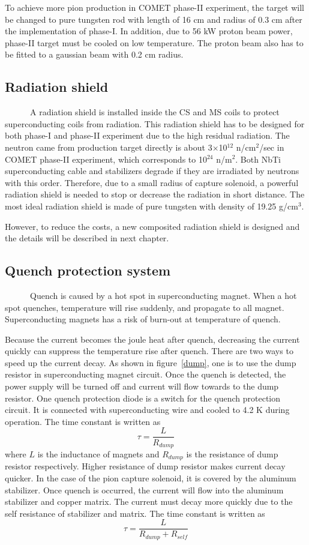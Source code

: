 To achieve more pion production in COMET phase-II experiment, the target will be changed to pure tungsten rod with length of 16 cm and radius of 0.3 cm after the implementation of phase-I.
In addition, due to 56 kW proton beam power, phase-II target must be cooled on low temperature.
The proton beam also has to be fitted to a gaussian beam with 0.2 cm radius.

\subsection{Radiation shield}
~~~~~~A radiation shield is installed inside the CS and MS coils to protect superconducting coils from radiation.
This radiation shield has to be designed for both phase-I and phase-II experiment due to the high residual radiation.
The neutron came from production target directly is about 3$\times$10$^{12}$ n/cm$^2$/sec in COMET phase-II experiment, which corresponds to 10$^{24}$ n/m$^2$.
Both NbTi superconducting cable and stabilizers degrade if they are irradiated by neutrons with this order.
Therefore, due to a small radius of capture solenoid, a powerful radiation shield is needed to stop or decrease the radiation in short distance.
The most ideal radiation shield is made of pure tungsten with density of 19.25 g/cm$^3$.

However, to reduce the costs, a new composited radiation shield is designed and the details will be described in next chapter.

\subsection{Quench protection system}
~~~~~~Quench is caused by a hot spot in superconducting magnet.
When a hot spot quenches, temperature will rise suddenly, and propagate to all magnet.
Superconducting magnets has a risk of burn-out at temperature of quench.

Because the current becomes the joule heat after quench, decreasing the current quickly can suppress the temperature rise after quench.
There are two ways to speed up the current decay.
As shown in figure~\ref{dump}, one is to use the dump resistor in superconducting magnet circuit.
Once the quench is detected, the power supply will be turned off and current will flow towards to the dump resistor.
One quench protection diode is a switch for the quench protection circuit.
It is connected with superconducting wire and cooled to 4.2 K during operation.
The time constant is written as
\begin{equation}
 \tau = \frac{L}{R_{dump}}
\end{equation}
where $L$ is the inductance of magnets and $R_{dump}$ is the resistance of dump resistor respectively.
Higher resistance of dump resistor makes current decay quicker.
In the case of the pion capture solenoid, it is covered by the aluminum stabilizer.
Once quench is occurred, the current will flow into the aluminum stabilizer and copper matrix.
The current must decay more quickly due to the self resistance of stabilizer and matrix.
The time constant is written as
\begin{equation}
 \tau = \frac{L}{R_{dump} + R_{self}}
\end{equation}


